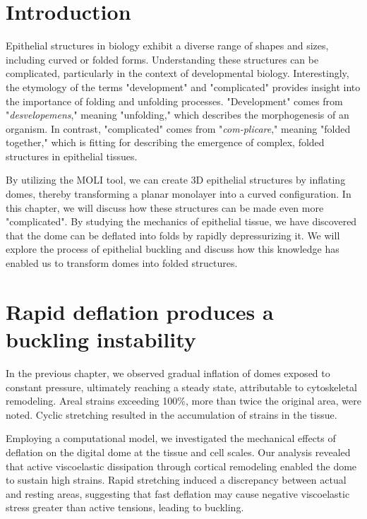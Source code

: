\hypertarget{introduction}{%
\section{Introduction}\label{introduction5}}

Epithelial structures in biology exhibit a diverse range of shapes and sizes, including curved or folded forms. Understanding these structures can be complicated, particularly in the context of developmental biology. Interestingly, the etymology of the terms "development" and "complicated" provides insight into the importance of folding and unfolding processes. "Development" comes from "\textit{desvelopemens}," meaning "unfolding," which describes the morphogenesis of an organism. In contrast, "complicated" comes from "\textit{com-plicare}," meaning "folded together," which is fitting for describing the emergence of complex, folded structures in epithelial tissues.

By utilizing the MOLI tool, we can create 3D epithelial structures by inflating domes, thereby transforming a planar monolayer into a curved configuration. In this chapter, we will discuss how these structures can be made even more "complicated". By studying the mechanics of epithelial tissue, we have discovered that the dome can be deflated into folds by rapidly depressurizing it. We will explore the process of epithelial buckling and discuss how this knowledge has enabled us to transform domes into folded structures.

\hypertarget{rapid-deflation-produces-a-buckling-instability}{%
	\section{Rapid deflation produces a buckling
		instability}\label{rapid-deflation-produces-a-buckling-instability}}


In the previous chapter, we observed gradual inflation of domes exposed to constant pressure, ultimately reaching a steady state, attributable to cytoskeletal remodeling. Areal strains exceeding 100\%, more than twice the original area, were noted. Cyclic stretching resulted in the accumulation of strains in the tissue.

Employing a computational model, we investigated the mechanical effects of deflation on the digital dome at the tissue and cell scales. Our analysis revealed that active viscoelastic dissipation through cortical remodeling enabled the dome to sustain high strains. Rapid stretching induced a discrepancy between actual and resting areas, suggesting that fast deflation may cause negative viscoelastic stress greater than active tensions, leading to buckling.


